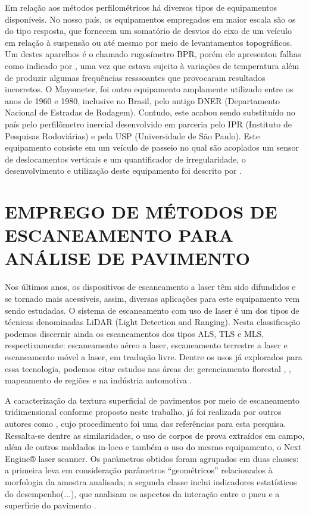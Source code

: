 Em relação aos métodos perfilométricos há diversos tipos de equipamentos disponíveis. No nosso país, os equipamentos empregados em maior escala são os do tipo resposta, que fornecem um somatório de desvios do eixo de um veículo em relação à suspensão ou até mesmo por meio de levantamentos topográficos. Um destes aparelhos é o chamado rugosímetro BPR, porém ele apresentou falhas como indicado por , uma vez que estava sujeito à variações de temperatura além de produzir algumas frequências resssoantes que provocaram resultados incorretos. O   Maysmeter, foi outro equipamento amplamente utilizado entre os anos de 1960 e 1980, inclusive no Brasil, pelo antigo DNER (Departamento Nacional de Estradas de Rodagem). Contudo, este acabou sendo substituído no país pelo perfilômetro inercial desenvolvido em parceria pelo IPR (Instituto de Pesquisas Rodoviárias) e pela USP (Universidade de São Paulo). Este equipamento consiste em um veículo de passeio no qual são acoplados um sensor de deslocamentos verticais e um quantificador de irregularidade, o desenvolvimento e utilização deste equipamento foi descrito por . 

\section{EMPREGO DE MÉTODOS DE ESCANEAMENTO PARA ANÁLISE DE PAVIMENTO}

Nos últimos anos, os dispositivos de escaneamento a laser têm sido difundidos e se tornado mais acessíveis, assim, diversas aplicações para este equipamento vem sendo estudadas. O sistema de escaneamento com uso de laser é um dos tipos de técnicas denominadas LiDAR (Light Detection and Ranging). Nesta classificação podemos discernir ainda os escaneamentos dos tipos ALS, TLS e MLS, respectivamente: escaneamento aéreo a laser, escaneamento terrestre a laser e escaneamento móvel a laser, em tradução livre. Dentre os usos já explorados para essa tecnologia, podemos citar estudos nas áreas de: gerenciamento florestal \cite{means}, \cite{giongo}, mapeamento de regiões \cite{schwarz} e na indústria automotiva \cite{rasshofer}.

A caracterização da textura superficial de pavimentos por meio de escaneamento tridimensional conforme proposto neste trabalho, já foi realizada por outros autores como , cujo procedimento foi uma das referências para esta pesquisa. Ressalta-se dentre as similaridades, o uso de corpos de prova extraídos em campo, além de outros moldados in-loco e também o uso do mesmo equipamento, o Next Engine® laser scanner.  Os parâmetros obtidos foram agrupados em duas classes: a primeira leva em consideração parâmetros “geométricos” relacionados à morfologia da amostra analisada; a segunda classe inclui indicadores estatísticos do desempenho(...), que analisam os aspectos da interação entre o pneu e a superfície do pavimento \cite{bitelli}.

